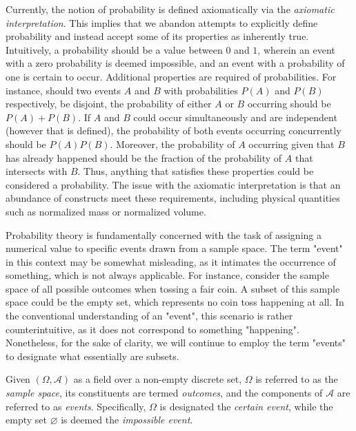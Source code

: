 Currently, the notion of probability is defined axiomatically via the \emph{axiomatic interpretation}. This implies that we abandon attempts to explicitly define probability and instead accept some of its properties as inherently true. Intuitively, a probability should be a value between $0$ and $1$, wherein an event with a zero probability is deemed impossible, and an event with a probability of one is certain to occur. Additional properties are required of probabilities. For instance, should two events $A$ and $B$ with probabilities $P \left( A \right)$ and $P \left( B \right)$ respectively, be disjoint, the probability of either $A$ or $B$ occurring should be $P \left( A \right) + P \left( B \right)$. If $A$ and $B$ could occur simultaneously and are independent (however that is defined), the probability of both events occurring concurrently should be $P \left( A \right) P \left( B \right)$. Moreover, the probability of $A$ occurring given that $B$ has already happened should be the fraction of the probability of $A$ that intersects with $B$. Thus, anything that satisfies these properties could be considered a probability. The issue with the axiomatic interpretation is that an abundance of constructs meet these requirements, including physical quantities such as normalized mass or normalized volume.

Probability theory is fundamentally concerned with the task of assigning a numerical value to specific events drawn from a sample space. The term "event" in this context may be somewhat misleading, as it intimates the occurrence of something, which is not always applicable. For instance, consider the sample space of all possible outcomes when tossing a fair coin. A subset of this sample space could be the empty set, which represents no coin toss happening at all. In the conventional understanding of an "event", this scenario is rather counterintuitive, as it does not correspond to something "happening". Nonetheless, for the sake of clarity, we will continue to employ the term "events" to designate what essentially are subsets.

\begin{definition}
Given $\left( \Omega, \mathcal{A} \right)$ as a field over a non-empty discrete set, $\Omega$ is referred to as the \emph{sample space}, its constituents are termed \emph{outcomes}, and the components of $\mathcal{A}$ are referred to as \emph{events}. Specifically, $\Omega$ is designated the \emph{certain event}, while the empty set $\varnothing$ is deemed the \emph{impossible event}.
\end{definition}

